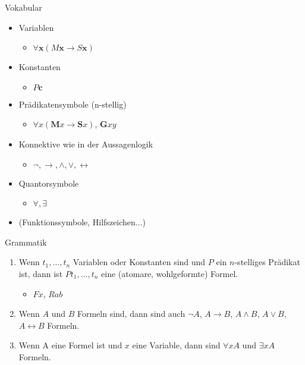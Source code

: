 \documentclass[12pt]{beamer}
\begin{document}
\begin{frame}{Vokabular}
  \begin{itemize}
  \item<1-> Variablen
    \begin{itemize}
    \item $\forall \mathbf{x} (M\mathbf{x} \to S\mathbf{x})$
    \end{itemize}
  \item<2-> Konstanten
    \begin{itemize}
    \item $P\mathbf{c}$
    \end{itemize}
  \item<3-> Prädikatensymbole (n-stellig)
    \begin{itemize}
    \item $\forall x (\mathbf{M}x \to \mathbf{S}x)$, $\mathbf{G}xy$
    \end{itemize}
  \item<4-> Konnektive wie in der Aussagenlogik
    \begin{itemize}
    \item $\neg, \to, \land, \lor, \leftrightarrow$
    \end{itemize}
  \item<5-> Quantorsymbole
    \begin{itemize}
    \item $\forall, \exists$
    \end{itemize}
  \item<6-> (Funktionssymbole, Hilfszeichen...)
  \end{itemize}
\end{frame}


\begin{frame}{Grammatik}
  \begin{enumerate}
  \item<1-> Wenn $t_1,...,t_n$ Variablen oder Konstanten sind und $P$
    ein $n$-stelliges Prädikat ist, dann ist $Pt_1,...,t_n$ eine
    (atomare, wohlgeformte) Formel.
    \begin{itemize}
    \item<2-> $Fx$, $Rab$
    \end{itemize}
  \item<3-> Wenn $A$ und $B$ Formeln sind, dann sind auch $\neg A$,
    $A\to B$, $A \land B$, $A \lor B$, $A \leftrightarrow B$ Formeln.
  \item<4-> Wenn A eine Formel ist und $x$ eine Variable, dann sind
    $\forall xA$ und $\exists x A$ Formeln.
  \end{enumerate}
\end{frame}
\end{document}
